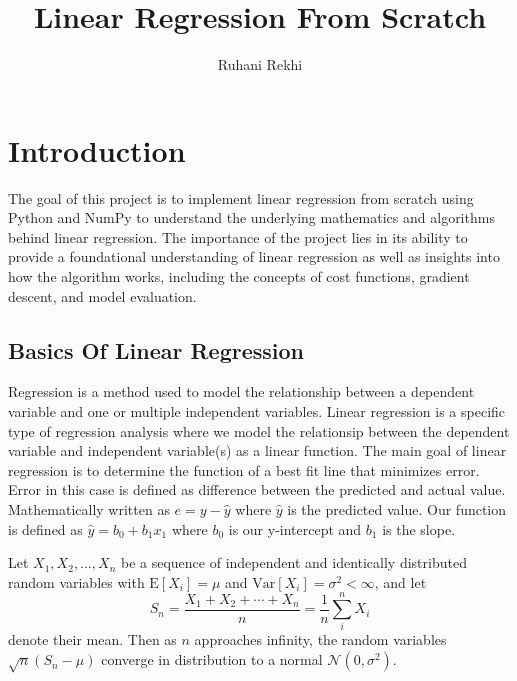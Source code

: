 \documentclass{article}
\title{Linear Regression From Scratch}
\author{Ruhani Rekhi}
\begin{document}
\maketitle


\section{Introduction}

The goal of this project is to implement linear regression from scratch using Python and NumPy to understand the underlying mathematics and algorithms behind linear regression.
The importance of the project lies in its ability to provide a foundational understanding of linear regression as well as insights into how the algorithm works, including the concepts of cost functions, gradient descent, and model evaluation.


\subsection{Basics Of Linear Regression}
Regression is a method used to model the relationship between a dependent variable and one or multiple independent variables. Linear regression is a specific type of regression analysis where we model the relationsip between the dependent variable and independent variable(s) as a linear function.
The main goal of linear regression is to determine the function of a best fit line that minimizes error. Error in this case is defined as difference between the predicted and actual value. Mathematically written as $ e = y - \hat{y}  $ where $\hat{y}$ is the predicted value. Our function is defined as $ \hat{y} = b_0 + b_1x_1 $ where $b_0$ is our y-intercept and $b_1$ is the slope.


Let $X_1, X_2, \ldots, X_n$ be a sequence of independent and identically distributed random variables with $\text{E}[X_i] = \mu$ and $\text{Var}[X_i] = \sigma^2 < \infty$, and let
\[S_n = \frac{X_1 + X_2 + \cdots + X_n}{n}
      = \frac{1}{n}\sum_{i}^{n} X_i\]
denote their mean. Then as $n$ approaches infinity, the random variables $\sqrt{n}(S_n - \mu)$ converge in distribution to a normal $\mathcal{N}(0, \sigma^2)$.
\end{document}
